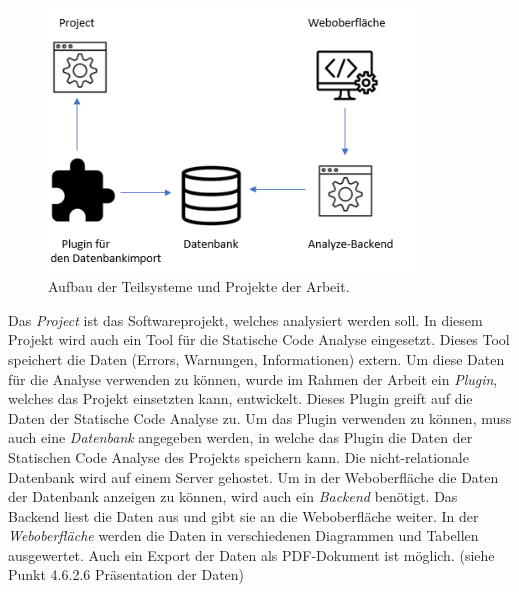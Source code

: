 \begin{figure}[tp]
  \centering
  \includegraphics[height=7cm]{images/infrastruktur.PNG}
 \caption[Aufbau der Teilsysteme und Projekte der Arbeit]{Aufbau der Teilsysteme und Projekte der Arbeit.}
  \label{fig:engine}
\end{figure}

Das \textit{Project} ist das Softwareprojekt, welches analysiert werden soll. In diesem Projekt wird auch ein Tool für die Statische Code Analyse eingesetzt. Dieses Tool speichert die Daten (Errors, Warnungen, Informationen) extern. Um diese Daten für die Analyse verwenden zu können, wurde im Rahmen der Arbeit ein \textit{Plugin}, welches das Projekt einsetzten kann, entwickelt. Dieses Plugin greift auf die Daten der Statische Code Analyse zu. Um das Plugin verwenden zu können, muss auch eine \textit{Datenbank} angegeben werden, in welche das Plugin die Daten der Statischen Code Analyse des Projekts speichern kann. Die nicht-relationale Datenbank wird auf einem Server gehostet. Um in der Weboberfläche die Daten der Datenbank anzeigen zu können, wird auch ein \textit{Backend} benötigt. Das Backend liest die Daten aus und gibt sie an die Weboberfläche weiter. In der \textit{Weboberfläche} werden die Daten in verschiedenen Diagrammen und Tabellen ausgewertet. Auch ein Export der Daten als PDF-Dokument ist möglich. (siehe Punkt 4.6.2.6 Präsentation der Daten)



\chapterend